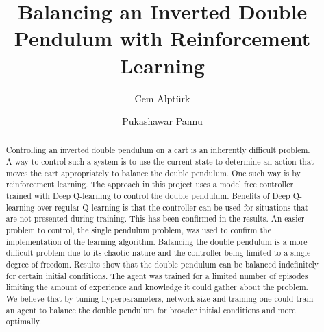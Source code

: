\documentclass[final]{LTHtwocol} %
\begin{document}
\begin{frontmatter}
\title{Balancing an Inverted Double Pendulum with Reinforcement Learning} %

\author[cem]{Cem Alpt\"urk}
\author[pukashawar]{Pukashawar Pannu}



\begin{abstract}
    Controlling an inverted double pendulum on a cart is an inherently difficult problem.
    A way to control such a system is to use the current state to determine an action that moves the cart appropriately to balance the double pendulum.
    One such way is by reinforcement learning.
    The approach in this project uses a model free controller trained with Deep Q-learning to control the double pendulum.
    Benefits of Deep Q-learning over regular Q-learning is that the controller can be used for situations that are not presented during training.
    This has been confirmed in the results.
  	An easier problem to control, the single pendulum problem, was used to confirm the implementation of the learning algorithm.
    Balancing the double pendulum is a more difficult problem due to its chaotic nature and the controller being limited to a single degree of freedom.
Results show that the double pendulum can be balanced indefinitely for certain initial conditions.
The agent was trained for a limited number of episodes limiting the amount of experience and knowledge it could gather about the problem.
We believe that by tuning hyperparameters, network size and training one could train an agent to balance the double pendulum for broader initial conditions and more optimally.
\end{abstract}

\end{frontmatter}

\end{document}
